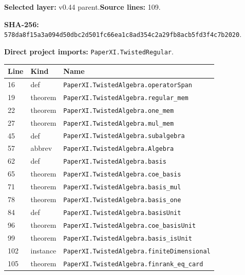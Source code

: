 \documentclass[10pt,oneside]{book}
\begin{document}
\textbf{Selected layer:} v0.44 parent.\quad\textbf{Source lines:} 109.\par\textbf{SHA-256:} {\scriptsize\nolinkurl{578da8f15a3a094d50dbc2d501fc66ea1c8ad354c2a29fb8acb5fd3f4c7b2020}}.


\textbf{Direct project imports:} \nolinkurl{PaperXI.TwistedRegular}.

\begin{longtable}{@{}p{}p{}p{}@{}}\toprule Line&Kind&Name\\\midrule\endhead

16&def&\nolinkurl{PaperXI.TwistedAlgebra.operatorSpan}\\

19&theorem&\nolinkurl{PaperXI.TwistedAlgebra.regular_mem}\\

22&theorem&\nolinkurl{PaperXI.TwistedAlgebra.one_mem}\\

27&theorem&\nolinkurl{PaperXI.TwistedAlgebra.mul_mem}\\

45&def&\nolinkurl{PaperXI.TwistedAlgebra.subalgebra}\\

57&abbrev&\nolinkurl{PaperXI.TwistedAlgebra.Algebra}\\

62&def&\nolinkurl{PaperXI.TwistedAlgebra.basis}\\

65&theorem&\nolinkurl{PaperXI.TwistedAlgebra.coe_basis}\\

71&theorem&\nolinkurl{PaperXI.TwistedAlgebra.basis_mul}\\

78&theorem&\nolinkurl{PaperXI.TwistedAlgebra.basis_one}\\

84&def&\nolinkurl{PaperXI.TwistedAlgebra.basisUnit}\\

96&theorem&\nolinkurl{PaperXI.TwistedAlgebra.coe_basisUnit}\\

99&theorem&\nolinkurl{PaperXI.TwistedAlgebra.basis_isUnit}\\

102&instance&\nolinkurl{PaperXI.TwistedAlgebra.finiteDimensional}\\

105&theorem&\nolinkurl{PaperXI.TwistedAlgebra.finrank_eq_card}\\

\bottomrule\end{longtable}
\end{document}
